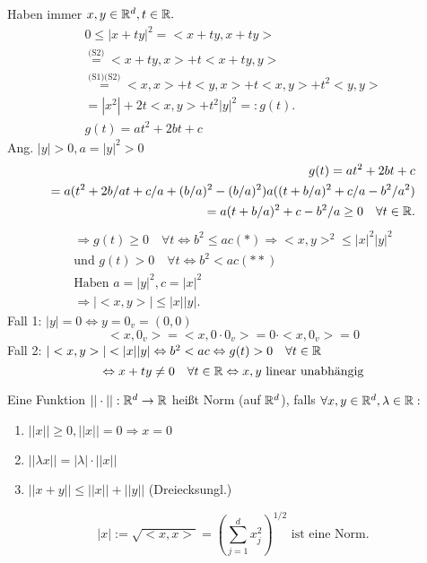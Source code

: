 \documentclass[../ana1.tex]{subfiles}
\begin{document}
\begin{bew}
	Haben immer \( x,y\in\mathbb{R}^d, t\in\mathbb{R}. \)
	\begin{align*}
		0\leq |x+ty|^2 = <x+ty, x+ty>\\
		\overset{\text{(S2)}}{=} <x+ty,x> + t<x+ty,y>\\
		\overset{\text{(S1)(S2)}}{=} <x,x> + t<y,x> + t<x,y> + t^2<y,y>\\
		= |x^2| + 2t<x,y> + t^2|y|^2 =: g(t).\\
		g(t) = at^2 + 2bt + c
	\end{align*}
	Ang. \(|y| > 0, a = |y|^2 > 0 \)
	\begin{align*}
		g(t) = at^2 + 2bt + c\\
		= a(t^2 + 2b/a t + c/a + (b/a)^2 - (b/a)^2) a((t+b/a)^2 + c/a - b^2/a^2)\\
		= a(t+b/a)^2 + c - b^2/a \geq 0 \quad\forall t\in\mathbb{R}.
	\end{align*}
	\begin{align*}
		\Rightarrow g(t) \geq 0 \quad\forall t \Leftrightarrow b^2 \leq ac (*) \Rightarrow <x,y>^2 \leq |x|^2|y|^2\\
		\text{und }g(t) > 0 \quad\forall t \Leftrightarrow b^2 < ac (**)\\
		\text{Haben }  a=|y|^2, c=|x|^2\\
		\Rightarrow |<x,y>|\leq |x||y|.
	\end{align*}
	Fall 1: \(|y| = 0 \Leftrightarrow y = 0_v = (0, 0)\)
	\[<x, 0_v> = <x, 0 \cdot 0_v> = 0 \cdot <x, 0_v> = 0\]
	Fall 2: \(|<x, y>| < |x||y| \Leftrightarrow b^2 < ac \Leftrightarrow g(t) > 0 \quad \forall t \in \mathbb{R}\)\\
	\[\Leftrightarrow x + ty \neq 0 \quad \forall t \in \mathbb{R} \Leftrightarrow x, y \text{ linear unabhängig} \]
\end{bew}
\begin{defi}
	Eine Funktion \( ||\cdot || : \mathbb{R}^d \rightarrow \mathbb{R} \) heißt Norm (auf \( \mathbb{R}^d \)), falls \( \forall x,y\in\mathbb{R}^d, \lambda\in\mathbb{R}: \)
	\begin{enumerate}
		\item \( ||x||\geq 0, ||x|| = 0 \Rightarrow x = 0 \)
		\item \( ||\lambda x|| = |\lambda|\cdot||x|| \)
		\item \( ||x+y|| \leq ||x|| + ||y|| \) (Dreiecksungl.)
	\end{enumerate}
\end{defi}
\begin{satz}
	\[ |x| := \sqrt{<x,x>} = \left(\sum_{j=1}^{d} x_j^2\right)^{1/2} \text{ ist eine Norm}. \]
\end{satz}
\end{document}
